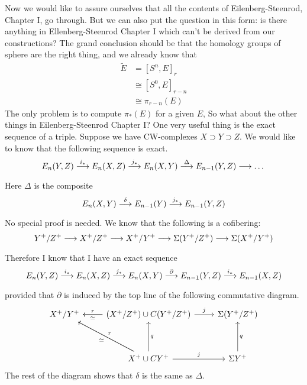 \documentclass[../main]{subfiles}
\begin{document}
Now we would like to assure ourselves that all the contents of Eilenberg-Steenrod, Chapter I, go through. But we can also put the question in this form: is there anything in Ellenberg-Steenrod Chapter I which can't be derived from our constructions? The grand conclusion should be that the homology groups of sphere are the right thing, and we already know that
\begin{align}
    \widetilde{E} &= [S^n, E]_r \nonumber \\
    &\cong [S^0, E]_{r-n} \nonumber \\
    &\cong \pi_{r-n}(E) \nonumber
\end{align}
The only problem is to compute $\pi_\ast(E)$ for a given $E$, So what about the other things in Eilenberg-Steenrod Chapter I? One very useful thing is the exact sequence of a triple. Suppose we have CW-complexes $X\supset Y\supset Z$. We would like to know that the following sequence is exact.
\[E_n(Y, Z)\vra{i_\ast} E_n(X, Z) \vra{j_\ast} E_n(X, Y) \vra{\Delta} E_{n-1}(Y, Z) \lra \dots\]
Here $\Delta$ is the composite
\[E_n(X,Y) \vra{\delta} E_{n-1}(Y)\vra{j_\ast} E_{n-1}(Y, Z)\]
No special proof is needed. We know that the following is a cofibering:
\[Y^+/Z^+ \vra{} X^+/Z^+\vra{}X^+/Y^+ \vra{} \Sigma(Y^+/Z^+) \vra{} \Sigma(X^+/Y^+)\]
Therefore I know that I have an exact sequence
\[E_n(Y,Z) \vra{i_\ast} E_n(X, Z)\vra{j_\ast}E_n(X, Y) \vra{\partial} E_{n-1}(Y, Z) \vra{i_\ast} E_{n-1}(X, Z)\]
provided that $\partial$ is induced by the top line of the following commutative diagram.
\[\begin{tikzcd}
	{X^+/Y^+} & {(X^+/Z^+)\cup C(Y^+/Z^+)} & {\Sigma(Y^+/Z^+)} \\
	\\
	& {X^+\cup CY^+} & {\Sigma Y^+}
	\arrow["j", from=1-2, to=1-3]
	\arrow["r"', from=1-2, to=1-1]
	\arrow["\simeq", from=1-2, to=1-1]
	\arrow["q"', from=3-2, to=1-2]
	\arrow["\simeq", from=3-2, to=1-1]
	\arrow["j", from=3-2, to=3-3]
	\arrow["q"', from=3-3, to=1-3]
	\arrow["r"', from=3-2, to=1-1]
\end{tikzcd}\]
The rest of the diagram shows that $\delta$ is the same as $\Delta$.
\end{document}
